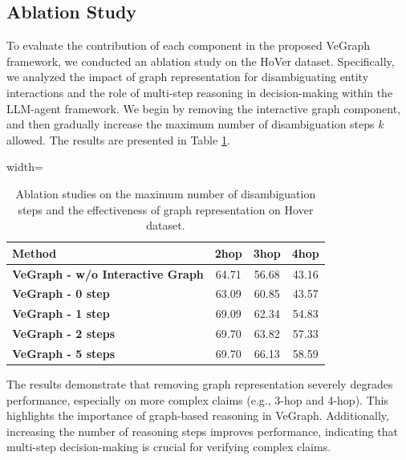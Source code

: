 \documentclass[11pt]{article}
\begin{document}
\subsection{Ablation Study}
To evaluate the contribution of each component in the proposed VeGraph framework, we conducted an ablation study on the HoVer dataset. Specifically, we analyzed the impact of graph representation for disambiguating entity interactions and the role of multi-step reasoning in decision-making within the LLM-agent framework. We begin by removing the interactive graph component, and then gradually increase the maximum number of disambiguation steps $k$ allowed. The results are presented in Table \ref{tab:ablation}.
\begin{table}[!h]
\centering
\begin{adjustbox}{width=\columnwidth}
\begin{tabular}{l|ccc}
\hline\hline
\textbf{Method} & \textbf{2hop} & \textbf{3hop} & \textbf{4hop} \\
\hline
\textbf{VeGraph - w/o Interactive Graph}  & 64.71 & 56.68 & 43.16 \\
\textbf{VeGraph - 0 step}  & 63.09 & 60.85 & 43.57 \\
\textbf{VeGraph - 1 step}  & 69.09 & 62.34 & 54.83 \\
\textbf{VeGraph - 2 steps} & 69.70 & 63.82 & 57.33 \\
\hline
\textbf{VeGraph - 5 steps} & 69.70 & 66.13 & 58.59 \\
\hline\hline
\end{tabular}
\end{adjustbox}
\caption{Ablation studies on the maximum number of disambiguation steps and the effectiveness of graph representation on Hover dataset.}
\label{tab:ablation}
\end{table}
The results demonstrate that removing graph representation severely degrades performance, especially on more complex claims (e.g., 3-hop and 4-hop). This highlights the importance of graph-based reasoning in VeGraph. Additionally, increasing the number of reasoning steps improves performance, indicating that multi-step decision-making is crucial for verifying complex claims.
\end{document}
